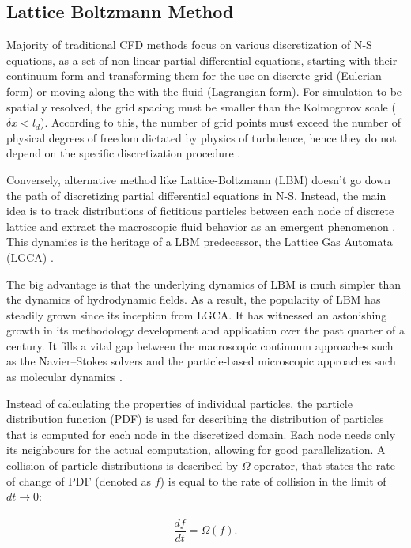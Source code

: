 \subsection{Lattice Boltzmann Method}\label{sec:lbm}
Majority of traditional CFD methods focus on various discretization of N-S equations, as a set of non-linear partial differential equations, starting with their continuum form and transforming them for the use on discrete grid (Eulerian form) or moving along the with the fluid (Lagrangian form). For simulation to be spatially resolved, the grid spacing must be smaller than the Kolmogorov scale ($\delta x < l_d$). According to this, the number of grid points must exceed the number of physical degrees of freedom dictated by physics of turbulence, hence they do not depend on the specific discretization procedure \citep{succi2018}.

Conversely, alternative method like Lattice-Boltzmann (LBM) doesn't go down the path of discretizing partial differential equations in N-S. Instead, the main idea is to track distributions of fictitious particles between each node of discrete lattice and extract the macroscopic fluid behavior as an emergent phenomenon \citep{succi2018}. This dynamics is the heritage of a LBM predecessor, the Lattice Gas Automata (LGCA) \citep{Hardy1973, frischLatticeGasAutomataNavierStokes1986}.

The big advantage is that the underlying dynamics of LBM is much simpler than the dynamics of hydrodynamic fields. As a result, the popularity of LBM has steadily grown since its inception from LGCA. It has witnessed an astonishing growth in its methodology development and application over the past quarter of a century. It fills a vital gap between the macroscopic continuum approaches such as the Navier–Stokes solvers and the particle-based microscopic approaches such as molecular dynamics \citep{liLatticeBoltzmannMethods2016a}.

Instead of calculating the properties of individual particles, the particle distribution function (PDF) is used for describing the distribution of particles that is computed for each node in the discretized domain. Each node needs only its neighbours for the actual computation, allowing for good parallelization. A collision of particle distributions is described by $\Omega$ operator, that states the rate of change of PDF (denoted as $f$) is equal to the rate of collision in the limit of $dt \xrightarrow[]{} 0$:

\begin{equation}
	\label{eq:collision-operator}
	\frac{df}{dt} = \Omega(f).
\end{equation}

